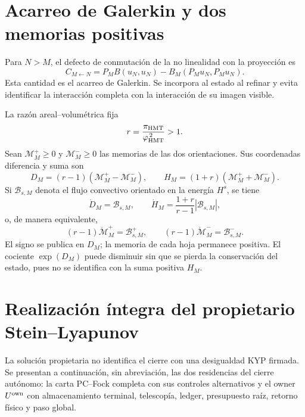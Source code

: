 \section*{Acarreo de Galerkin y dos memorias positivas}

Para \(N>M\), el defecto de conmutación de la no linealidad con la
proyección es
\begin{equation}\label{eq:realizaciones-ns-acarreo}
 C_{M\leftarrow N}
 =P_MB(u_N,u_N)-B_M(P_Mu_N,P_Mu_N).
\end{equation}
Esta cantidad es el acarreo de Galerkin. Se incorpora al estado al refinar y
evita identificar la interacción completa con la interacción de su imagen
visible.

La razón areal--volumétrica fija
\begin{equation}\label{eq:realizaciones-ns-r}
 r=\frac{\pi_{\rm HMT}}{\varphi_{\rm HMT}^{\,2}}>1.
\end{equation}
Sean \(\mathcal M_M^+\geq0\) y \(\mathcal M_M^-\geq0\) las memorias de las dos orientaciones.
Sus coordenadas diferencia y suma son
\begin{equation}\label{eq:realizaciones-ns-dh}
 D_M=(r-1)(\mathcal M_M^+-\mathcal M_M^-),
 \qquad
 H_M=(1+r)(\mathcal M_M^++\mathcal M_M^-).
\end{equation}
Si \(\mathcal B_{s,M}\) denota el flujo convectivo orientado en la energía
\(H^s\), se tiene
\begin{equation}\label{eq:realizaciones-ns-dh-derivadas}
 \dot D_M=\mathcal B_{s,M},
 \qquad
 \dot H_M=\frac{1+r}{r-1}|\mathcal B_{s,M}|,
\end{equation}
o, de manera equivalente,
\begin{equation}\label{eq:realizaciones-ns-memorias-positivas}
 (r-1)\dot{\mathcal M}_M^+=\mathcal B_{s,M}^{+},
 \qquad
 (r-1)\dot{\mathcal M}_M^-=\mathcal B_{s,M}^{-}.
\end{equation}
El signo se publica en \(D_M\); la memoria de cada hoja permanece positiva.
El cociente \(\exp(D_M)\) puede disminuir sin que se pierda la conservación
del estado, pues no se identifica con la suma positiva \(H_M\).

\section*{Realización íntegra del propietario Stein--Lyapunov}

La solución propietaria no identifica el cierre con una desigualdad KYP
firmada. Se presentan a continuación, sin abreviación, las dos residencias
del cierre autónomo: la carta PC--Fock completa con sus controles
alternativos y el owner \(U^{\rm own}\) con almacenamiento terminal,
telescopía, ledger, presupuesto raíz, retorno físico y paso global.


